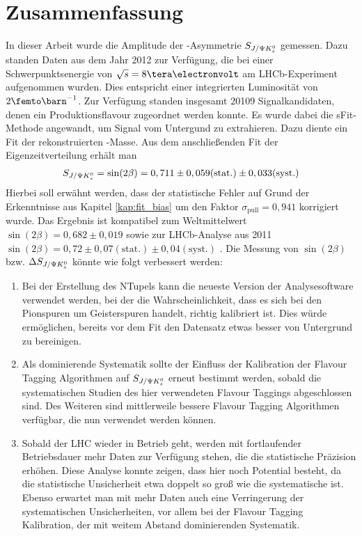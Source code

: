 \chapter{Zusammenfassung}
In dieser Arbeit wurde die Amplitude der \CP-Asymmetrie $S_{J/\Psi K_s^0}$ gemessen. Dazu standen Daten aus dem Jahr 2012 zur Verfügung, die bei einer Schwerpunktsenergie von $\sqrt{s}=8\tera\electronvolt$ am LHCb-Experiment aufgenommen wurden. Dies entspricht einer integrierten Luminosität von $2\femto\barn^{-1}$. Zur Verfügung standen insgesamt 20109 Signalkandidaten, denen ein Produktionsflavour zugeordnet werden konnte. Es wurde dabei die sFit-Methode angewandt, um Signal vom Untergund zu extrahieren. Dazu diente ein Fit der rekonstruierten \Bd-Masse. Aus dem anschließenden Fit der Eigenzeitverteilung erhält man
\begin{align}
S_{J/\Psi K_s^0} = \sin(2\beta) = 0,711 \pm 0,059 (\text{stat.}) \pm 0,033 (\text{syst.})
\end{align}
Hierbei soll erwähnt werden, dass der statistische Fehler auf Grund der Erkenntnisse aus Kapitel \ref{kap:fit_bias} um den Faktor $\sigma_{\text{pull}} = 0,941$ korrigiert wurde. Das Ergebnis ist kompatibel zum Weltmittelwert $\sin(2\beta) = 0,682 \pm 0,019$ \cite{pdg-average} sowie zur LHCb-Analyse aus 2011 $\sin(2\beta) = 0,72 \pm 0,07 (\text{stat.}) \pm 0,04 (\text{syst.})$ \cite{lhcb-paper}. Die Messung von $\sin(2\beta)$ bzw. $\Delta S_{J/\Psi K_s^0}$ könnte wie folgt verbessert werden:
\begin{enumerate}
    \item Bei der Erstellung des NTupels kann die neueste Version der Analysesoftware verwendet werden, bei der die Wahrscheinlichkeit, dass es sich bei den Pionspuren um Geisterspuren handelt, richtig kalibriert ist. Dies würde ermöglichen, bereits vor dem Fit den Datensatz etwas besser von Untergrund zu bereinigen.
    \item Als dominierende Systematik sollte der Einfluss der Kalibration der Flavour Tagging Algorithmen auf $S_{J/\Psi K_s^0}$ erneut bestimmt werden, sobald die systematischen Studien des hier verwendeten Flavour Taggings abgeschlossen sind. Des Weiteren sind mittlerweile bessere Flavour Tagging Algorithmen verfügbar, die nun verwendet werden können.
    \item Sobald der LHC wieder in Betrieb geht, werden mit fortlaufender Betriebsdauer mehr Daten zur Verfügung stehen, die die statistische Präzision erhöhen. Diese Analyse konnte zeigen, dass hier noch Potential besteht, da die statistische Unsicherheit etwa doppelt so groß wie die systematische ist. Ebenso erwartet man mit mehr Daten auch eine Verringerung der systematischen Unsicherheiten, vor allem bei der Flavour Tagging Kalibration, der mit weitem Abstand dominierenden Systematik.
\end{enumerate}
